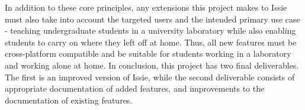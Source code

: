 In addition to these core principles, any extensions this project makes to Issie must also take into account the targeted users and the intended primary use case - teaching undergraduate students in a university laboratory while also enabling students to carry on where they left off at home. Thus, all new features must be cross-platform compatible and be suitable for students working in a laboratory and working alone at home. In conclusion, this project has two final deliverables. The first is an improved version of Issie, while the second deliverable consists of appropriate documentation of added features, and improvements to the documentation of existing features.



